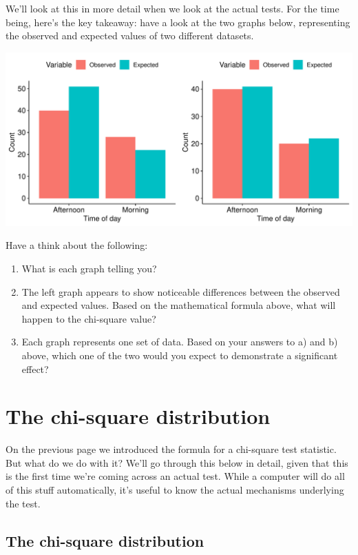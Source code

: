 \documentclass[
]{book}
\begin{document}
We'll look at this in more detail when we look at the actual tests. For the time being, here's the key takeaway: have a look at the two graphs below, representing the observed and expected values of two different datasets.

\includegraphics{_main_files/figure-latex/unnamed-chunk-94-1.pdf}

Have a think about the following:

\begin{enumerate}
\def\labelenumi{\arabic{enumi}.}
\item
  What is each graph telling you?
\item
  The left graph appears to show noticeable differences between the observed and expected values. Based on the mathematical formula above, what will happen to the chi-square value?
\item
  Each graph represents one set of data. Based on your answers to a) and b) above, which one of the two would you expect to demonstrate a significant effect?
\end{enumerate}

\hypertarget{the-chi-square-distribution}{%
\section{The chi-square distribution}\label{the-chi-square-distribution}}

On the previous page we introduced the formula for a chi-square test statistic. But what do we do with it? We'll go through this below in detail, given that this is the first time we're coming across an actual test. While a computer will do all of this stuff automatically, it's useful to know the actual mechanisms underlying the test.

\hypertarget{the-chi-square-distribution-1}{%
\subsection{The chi-square distribution}\label{the-chi-square-distribution-1}}
\end{document}
